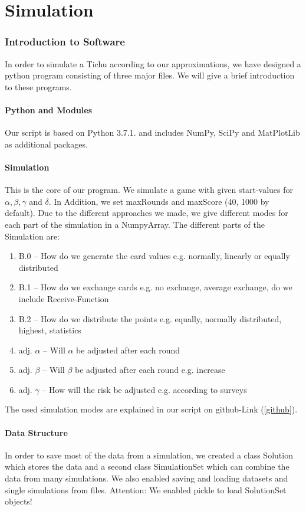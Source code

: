 \section{Simulation}
\subsubsection{Introduction to Software}
In order to simulate a Tichu according to our approximations, we have designed a python program consisting of three major files. We will give a brief introduction to these programs.

\paragraph{Python and Modules}
Our script is based on Python 3.7.1. and includes NumPy, SciPy and MatPlotLib as additional packages. 

\paragraph{Simulation}
This is the core of our program. We simulate a game with given start-values for $\alpha, \beta, \gamma$ and $\delta$. In Addition, we set maxRounds and maxScore (40, 1000 by default). 
Due to the different approaches we made, we give different modes for each part of the simulation in a NumpyArray. The different parts of the Simulation are:
\begin{enumerate}
\item B.0 – How do we generate the card values e.g. normally, linearly or equally distributed
\item B.1 – How do we exchange cards e.g. no exchange, average exchange, do we include Receive-Function
\item B.2 – How do we distribute the points e.g. equally, normally distributed, highest, statistics
\item adj. $\alpha$ – Will $\alpha$ be adjusted after each round
\item adj. $\beta$ – Will $\beta$ be adjusted after each round e.g. increase
\item adj. $\gamma$ – How will the risk be adjusted e.g. according to surveys
\end{enumerate}
The used simulation modes are explained in our script on github-Link (\ref{github}).

\paragraph{Data Structure}
In order to save most of the data from a simulation, we created a class Solution which stores the data and a second class SimulationSet which can combine the data from many simulations. We also enabled saving and loading datasets and single simulations from files. Attention: We enabled pickle to load SolutionSet objects!  

